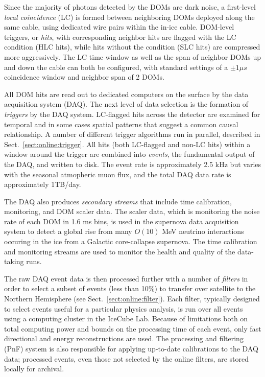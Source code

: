 Since the majority of photons detected by the DOMs are dark noise, a
first-level \emph{local coincidence} (LC) is formed between neighboring
DOMs deployed along the same cable, using dedicated wire pairs within the
in-ice cable.  DOM-level triggers, or \emph{hits}, with corresponding
neighbor hits are flagged with the LC condition (HLC hits), while hits without the
condition (SLC hits) are compressed more aggressively.  The LC time window
as well as the span of neighbor DOMs up and down the cable can both be configured,
with standard settings of a $\pm1 \mu s$ coincidence window and neighbor
span of 2 DOMs.

All DOM hits are read out to dedicated computers on the surface by the data
acquisition system (DAQ).  The next level of data selection is the
formation of \emph{triggers} by the DAQ system.  LC-flagged hits across the
detector are examined for temporal and in some cases spatial patterns that
suggest a common causal relationship.  A number of different trigger
algorithms run in parallel, described in Sect.~\ref{sect:online:trigger}.  All hits
(both LC-flagged and non-LC hits) within a window around the trigger are
combined into \emph{events}, the fundamental output of the DAQ, and written
to disk.  The event rate is approximately 2.5 kHz but varies with the
seasonal atmopheric muon flux, and the total DAQ data rate is approximately
1TB/day.

The DAQ also produces \emph{secondary streams} that include time
calibration, monitoring, and DOM scaler data.  The scaler data, which is
monitoring the noise rate of each DOM in 1.6 ms bins, is used in the
supernova data acquisition system \cite{IC3:supernova} to detect a global rise from
many $O(10)$ MeV neutrino interactions occuring in the ice from a
Galactic core-collapse supernova.  The time calibration and monitoring
streams are used to monitor the health and quality of the data-taking runs.

The raw DAQ event data is then processed further with a number of
\emph{filters} in order to select a subset of events (less than 10\%) to
transfer over satellite to the Northern Hemisphere (see
Sect.~\ref{sect:online:filter}).  Each
filter, typically designed to select events useful for a particular physics
analysis, is run
over all events using a computing cluster in the IceCube Lab.  Because of
limitations both on total computing power and bounds on the processing time
of each event, only fast directional and energy reconstructions are used.
The processing and filtering (PnF) system is also responsible for applying
up-to-date calibrations to the DAQ data; processed events, even those not
selected by the online filters, are stored locally for archival.

